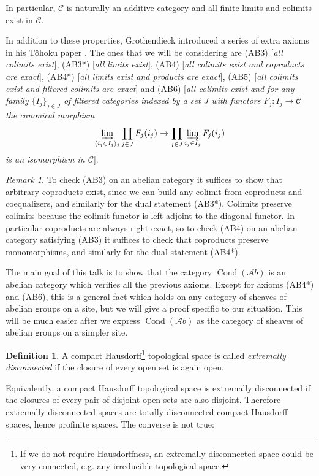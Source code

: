 \documentclass[11pt,A4]{article}
\theoremstyle{plain}
\theoremstyle{definition}
\newtheorem{defn}[thm]{Definition}
\theoremstyle{remark}
\newtheorem{rem}[thm]{Remark}
\newcommand{\1}{\mathbbm{1}}
\newcommand{\C}{\mathscr{C}}
\newcommand{\Ab}{\mathscr{A}b}
\DeclareMathOperator{\Cond}{Cond}
\begin{document}
In particular, $\C$ is naturally an additive category and all finite limits and colimits exist in $\C$.

In addition to these properties, Grothendieck introduced a series of extra axioms in his T\^{o}hoku paper \cite{gro57}.
The ones that we will be considering are (AB3) [\textit{all colimits exist}], (AB3*) [\textit{all limits exist}], (AB4) [\textit{all colimits exist and coproducts are exact}], (AB4*) [\textit{all limits exist and products are exact}], (AB5) [\textit{all colimits exist and filtered colimits are exact}] and (AB6) [\textit{all colimits exist and for any family $\{ I_{j}\}_{j\in J}$ of filtered categories indexed by a set $J$ with functors $F_{j}\colon I_{j}\to \C$ the canonical morphism
	\[ \varinjlim_{(i_{j}\in I_{j})_{j}} \prod_{j\in J}F_{j}(i_{j})\to \prod_{j\in J}\varinjlim_{i_{j}\in I_{j}} F_{j}(i_{j}) \]
is an isomorphism in $\C$}].

\begin{rem}
    To check (AB3) on an abelian category it suffices to show that arbitrary coproducts exist, since we can build any colimit from coproducts and coequalizers, and similarly for the dual statement (AB3*).
    Colimits preserve colimits because the colimit functor is left adjoint to the diagonal functor.
    In particular coproducts are always right exact, so to check (AB4) on an abelian category satisfying (AB3) it suffices to check that coproducts preserve monomorphisms, and similarly for the dual statement (AB4*).
\end{rem}

The main goal of this talk is to show that the category $\Cond(\Ab)$ is an abelian category which verifies all the previous axioms.
Except for axioms (AB4*) and (AB6), this is a general fact which holds on any category of sheaves of abelian groups on a site, but we will give a proof specific to our situation.
This will be much easier after we express $\Cond(\Ab)$ as the category of sheaves of abelian groups on a simpler site.

\begin{defn}
    A compact Hausdorff\footnote{If we do not require Hausdorffness, an extremally disconnected space could be very connected, e.g. any irreducible topological space.} topological space is called \textit{extremally disconnected} if the closure of every open set is again open.
\end{defn}

Equivalently, a compact Hausdorff topological space is extremally disconnected if the closures of every pair of disjoint open sets are also disjoint.
Therefore extremally disconnected spaces are totally disconnected compact Hausdorff spaces, hence profinite spaces.
The converse is not true:
\end{document}
